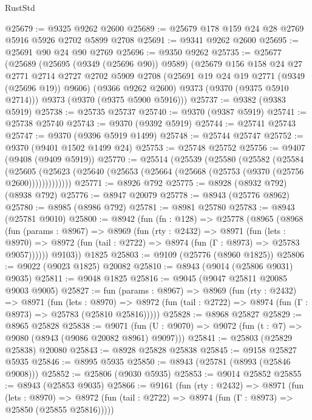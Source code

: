 \begin{lexlean}{RustStd}
\begin{coremodule}
{\begin{coremodule}
{{{{{{{{{{{{{{{{{{{{{{{{{{{{{{{{{{{{{{{@25679 := @9325 @9262 @2600
@25689 := @25679 @178 @159 @24 @28 @2769 @5916 @5926 @2702 @5899 @2708
@25691 := @9341 @9262 @2600
@25695 := @25691 @90 @24 @90 @2769
@25696 := @9350 @9262
@25735 := @25677
    (@25689
      (@25695 (@9349 (@25696 @90)) @9589)
      (@25679
        @156
        @158
        @24
        @27
        @2771
        @2714
        @2727
        @2702
        @5909
        @2708
        (@25691 @19 @24 @19 @2771 (@9349 (@25696 @19)) @9606)
        (@9366 @9262 @2600)
        @9373
        (@9370 (@9375 @5910 @2714)))
      @9373
      (@9370 (@9375 @5900 @5916)))
@25737 := @9382 (@9383 @5919)
@25738 := @25735 @25737
@25740 := @9370 (@9387 @5919)
@25741 := @25738 @25740
@25743 := @9370 (@9392 @5919)
@25744 := @25741 @25743
@25747 := @9370 (@9396 @5919 @1499)
@25748 := @25744 @25747
@25752 := @9370 (@9401 @1502 @1499 @24)
@25753 := @25748 @25752
@25756 := @9407 (@9408 (@9409 @5919))
@25770 := @25514
    (@25539
      (@25580
        (@25582
          (@25584
            (@25605
              (@25623 (@25640 (@25653 (@25664 (@25668 (@25753 (@9370 (@25756 @2600)))))))))))))
@25771 := @8926 @792
@25775 := @8928 (@8932 @792) (@8938 @792)
@25776 := @8947 @20079
@25778 := @8943 (@25776 @8962)
@25780 := @8985 (@8986 @792)
@25781 := @8981 @25780
@25783 := @8943 (@25781 @9010)
@25800 := @8942
    (fun (fn : @128) =>
    @25778
      (@8965
        (@8968
          (fun (params : @8967) =>
          @8969
            (fun (rty : @2432) =>
            @8971
              (fun (lets : @8970) =>
              @8972 (fun (tail : @2722) => @8974 (fun (Γ : @8973) => @25783 @9057))))))
        @9103))
    @1825
@25803 := @9109 (@25776 (@8960 @1825))
@25806 := @9022 (@9023 @1825) @20082
@25810 := @8943 (@9014 (@25806 @9031) @9035)
@25811 := @9048 @1825
@25816 := @9045 (@9047 @25811 @20085 @9003 @9005)
@25827 := fun (params : @8967) =>
  @8969
    (fun (rty : @2432) =>
    @8971
      (fun (lets : @8970) =>
      @8972 (fun (tail : @2722) => @8974 (fun (Γ : @8973) => @25783 (@25810 @25816)))))
@25828 := @8968 @25827
@25829 := @8965 @25828
@25838 := @9071
    (fun (U : @9070) => @9072 (fun (t : @7) => @9080 (@8943 (@9086 @20082 @8961) @9097)))
@25841 := @25803 (@25829 @25838) @20080
@25843 := @8928 @25828 @25838
@25845 := @9158 @25827 @5935
@25846 := @8995 @5935
@25850 := @8943 (@25781 (@8993 (@25846 @9008)))
@25852 := @25806 (@9030 @5935)
@25853 := @9014 @25852
@25855 := @8943 (@25853 @9035)
@25866 := @9161
    (fun (rty : @2432) =>
    @8971
      (fun (lets : @8970) =>
      @8972 (fun (tail : @2722) => @8974 (fun (Γ : @8973) => @25850 (@25855 @25816)))))
}}}}}}}}}}}}}}}}}}}}}}}}}}}}}}}}}}}}}}}
\end{coremodule}}
\end{coremodule}
\end{lexlean}
